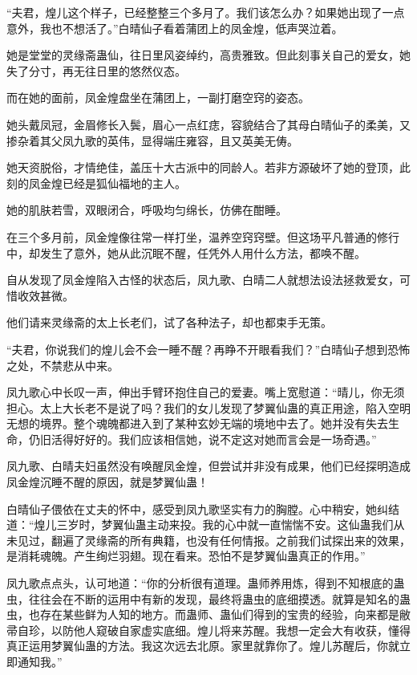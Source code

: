 
\begin{this_body}



“夫君，煌儿这个样子，已经整整三个多月了。我们该怎么办？如果她出现了一点意外，我也不想活了。”白晴仙子看着蒲团上的凤金煌，低声哭泣着。

她是堂堂的灵缘斋蛊仙，往日里风姿绰约，高贵雅致。但此刻事关自己的爱女，她失了分寸，再无往日里的悠然仪态。

而在她的面前，凤金煌盘坐在蒲团上，一副打磨空窍的姿态。

她头戴凤冠，金眉修长入鬓，眉心一点红痣，容貌结合了其母白晴仙子的柔美，又掺杂着其父凤九歌的英伟，显得端庄雍容，且又英美无俦。

她天资脱俗，才情绝佳，盖压十大古派中的同龄人。若非方源破坏了她的登顶，此刻的凤金煌已经是狐仙福地的主人。

她的肌肤若雪，双眼闭合，呼吸均匀绵长，仿佛在酣睡。

在三个多月前，凤金煌像往常一样打坐，温养空窍窍壁。但这场平凡普通的修行中，却发生了意外，她从此沉眠不醒，任凭外人用什么方法，都唤不醒。

自从发现了凤金煌陷入古怪的状态后，凤九歌、白晴二人就想法设法拯救爱女，可惜收效甚微。

他们请来灵缘斋的太上长老们，试了各种法子，却也都束手无策。

“夫君，你说我们的煌儿会不会一睡不醒？再睁不开眼看我们？”白晴仙子想到恐怖之处，不禁悲从中来。

凤九歌心中长叹一声，伸出手臂环抱住自己的爱妻。嘴上宽慰道：“晴儿，你无须担心。太上大长老不是说了吗？我们的女儿发现了梦翼仙蛊的真正用途，陷入空明无想的境界。整个魂魄都进入到了某种玄妙无端的境地中去了。她并没有失去生命，仍旧活得好好的。我们应该相信她，说不定这对她而言会是一场奇遇。”

凤九歌、白晴夫妇虽然没有唤醒凤金煌，但尝试并非没有成果，他们已经探明造成凤金煌沉睡不醒的原因，就是梦翼仙蛊！

白晴仙子偎依在丈夫的怀中，感受到凤九歌坚实有力的胸膛。心中稍安，她纠结道：“煌儿三岁时，梦翼仙蛊主动来投。我的心中就一直惴惴不安。这仙蛊我们从未见过，翻遍了灵缘斋的所有典籍，也没有任何情报。之前我们试探出来的效果，是消耗魂魄。产生绚烂羽翅。现在看来。恐怕不是梦翼仙蛊真正的作用。”

凤九歌点点头，认可地道：“你的分析很有道理。蛊师养用炼，得到不知根底的蛊虫，往往会在不断的运用中有新的发现，最终将蛊虫的底细摸透。就算是知名的蛊虫，也存在某些鲜为人知的地方。而蛊师、蛊仙们得到的宝贵的经验，向来都是敝帚自珍，以防他人窥破自家虚实底细。煌儿将来苏醒。我想一定会大有收获，懂得真正运用梦翼仙蛊的方法。我这次远去北原。家里就靠你了。煌儿苏醒后，你就立即通知我。”


\end{this_body}
